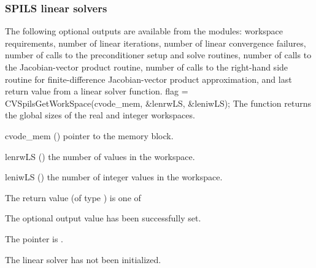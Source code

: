 \subsubsection{SPILS linear solvers}\label{sss:optout_spils}
The following optional outputs are available from the {\cvspils}
modules: workspace requirements, number of linear iterations, number of
linear convergence failures, number of calls to the preconditioner
setup and solve routines, number of calls to the Jacobian-vector
product routine, number of calls to the right-hand side routine for
finite-difference Jacobian-vector product approximation, and last
return value from a linear solver function.
{
  flag = CVSpilsGetWorkSpace(cvode\_mem, \&lenrwLS, \&leniwLS);
}
{
  The function  returns the global sizes of the
  {\cvspgmr} real and integer workspaces.
}
{
  \begin{args}
  \item[cvode\_mem] ()
    pointer to the {\cvode} memory block.
  \item[lenrwLS] ()
    the number of  values in the {\cvspils} workspace.
  \item[leniwLS] ()
    the number of integer values in the {\cvspils} workspace.
  \end{args}
}
{
  The return value  (of type ) is one of
  \begin{args}
  \item[\Id{CVSPILS\_SUCCESS}] 
    The optional output value has been successfully set.
  \item[\Id{CVSPILS\_MEM\_NULL}]
    The  pointer is .
  \item[\Id{CVSPILS\_LMEM\_NULL}]
    The {\cvspils} linear solver has not been initialized.
  \end{args}
}
